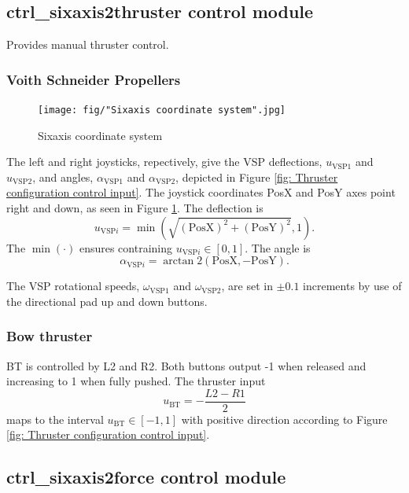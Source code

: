 \documentclass[a4paper,twoside,english]{report}
\begin{document}
\subsection{ctrl\_sixaxis2thruster control module}

Provides manual thruster control.

\subsubsection{Voith Schneider Propellers}

\begin{figure}[!h]
\centering \texttt{[image: fig/"Sixaxis coordinate system".jpg]}
\caption{Sixaxis coordinate system}

\label{fig: sixaxis coordinate system} 
\end{figure}

The left and right joysticks, repectively, give the VSP deflections,
$u_{\text{VSP1}}$ and $u_{\text{VSP2}}$, and angles, $\alpha_{\text{VSP1}}$
and $\alpha_{\text{VSP2}}$, depicted in Figure \ref{fig: Thruster configuration control input}.
The joystick coordinates PosX and PosY axes point right and down,
as seen in Figure \ref{fig: sixaxis coordinate system}. The deflection
is
\[
u_{\text{VSP}i}=\min\left(\sqrt{\left(\text{PosX}\right)^{2}+\left(\text{PosY}\right)^{2}},1\right).
\]
The $\min\left(\cdot\right)$ ensures contraining $u_{\text{VSP}i}\in\left[0,1\right]$.
The angle is
\[
\alpha_{\text{VSP}i}=\arctan2\left(\text{PosX},-\text{PosY}\right).
\]

The VSP rotational speeds, $\omega_{\text{VSP1}}$ and $\omega_{\text{VSP2}}$,
are set in $\pm0.1$ increments by use of the directional pad up and
down buttons.

\subsubsection{Bow thruster}

BT is controlled by L2 and R2. Both buttons output -1 when released
and increasing to 1 when fully pushed. The thruster input
\[
u_{\text{BT}}=-\frac{L2-R1}{2}
\]
maps to the interval $u_{\text{BT}}\in\left[-1,1\right]$ with positive
direction according to Figure \ref{fig: Thruster configuration control input}.

\subsection{ctrl\_sixaxis2force control module}
\end{document}
